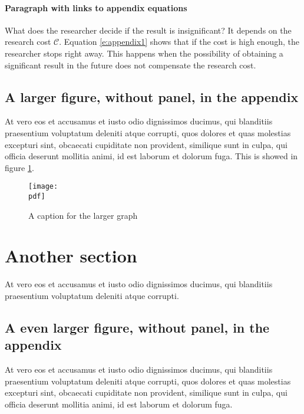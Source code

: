 \documentclass[letterpaper,12pt,leqno]{article}
\newcommand{\pdf}{figures.pdf}
\begin{document}
\paragraph{Paragraph with links to appendix equations} What does the researcher decide if the result is insignificant? It depends on the research cost $\mathcal{C}$. Equation \eqref{e:appendix1} shows that if the cost is high enough, the researcher stops right away. This happens when the possibility of obtaining a significant result in the future does not compensate the research cost.

\subsection{A larger figure, without panel, in the appendix} 

At vero eos et accusamus et iusto odio dignissimos ducimus, qui blanditiis praesentium voluptatum deleniti atque corrupti, quos dolores et quas molestias excepturi sint, obcaecati cupiditate non provident, similique sunt in culpa, qui officia deserunt mollitia animi, id est laborum et dolorum fuga. This is showed in figure \ref{f:appendix1}.

\begin{figure}[t]
\texttt{[image: \\pdf]}
\caption{A caption for the larger graph}
\label{f:appendix1}\end{figure}

\section{Another section}\label{a:appendix2}

At vero eos et accusamus et iusto odio dignissimos ducimus, qui blanditiis praesentium voluptatum deleniti atque corrupti.

\subsection{A even larger figure, without panel, in the appendix} 

At vero eos et accusamus et iusto odio dignissimos ducimus, qui blanditiis praesentium voluptatum deleniti atque corrupti, quos dolores et quas molestias excepturi sint, obcaecati cupiditate non provident, similique sunt in culpa, qui officia deserunt mollitia animi, id est laborum et dolorum fuga. 
\end{document}
